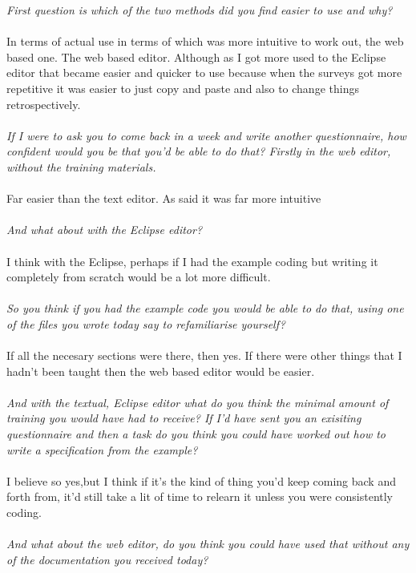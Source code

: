 \textit{First question is which of the two methods did you find easier to use and why?}
\\
\\
In terms of actual use in terms of which was more intuitive to work out, the web based one. The web based editor. Although as I got more used to the Eclipse editor that became easier and quicker to use because when the surveys got more repetitive it was easier to just copy and paste and also to change things retrospectively.
\\
\\
\textit{If I were to ask you to come back in a week and write another questionnaire, how confident would you be that you'd be able to do that? Firstly in the web editor, without the training materials.}
\\
\\
Far easier than the text editor. As said it was far more intuitive
\\
\\
\textit{And what about with the Eclipse editor?}
\\
\\
I think with the Eclipse, perhaps if I had the example coding but writing it completely from scratch would be a lot more difficult.
\\
\\
\textit{So you think if you had the example code you would be able to do that, using one of the files you wrote today say to refamiliarise yourself?}
\\
\\
If all the necesary sections were there, then yes. If there were other things that I hadn't been taught then the web based editor would be easier.
\\
\\
\textit{And with the textual, Eclipse editor what do you think the minimal amount of training you would have had to receive? If I'd have sent you an exisiting questionnaire and then a task do you think you could have worked out how to write a specification from the example?}
\\
\\
I believe so yes,but I think if it's the kind of thing you'd keep coming back and forth from, it'd still take a lit of time to relearn it unless you were consistently coding.
\\
\\
\textit{And what about the web editor, do you think you could have used that without any of the documentation you received today?}
